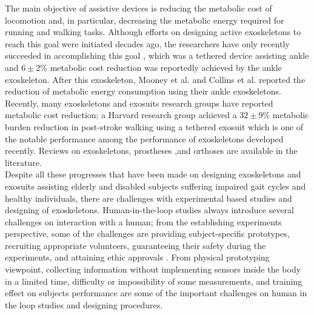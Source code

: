 \documentclass[10pt,letterpaper]{article}
\begin{document}
The main objective of assistive devices is reducing the metabolic cost of locomotion and, in particular, decreasing the metabolic energy required for running and walking tasks. Although efforts on designing active exoskeletons to reach this goal were initiated decades ago, the researchers have only recently succeeded in accomplishing this goal \cite{40}, which was a tethered device assisting ankle and  $6 \pm 2$\% metabolic cost reduction was reportedly achieved by the ankle exoskeleton. After this exoskeleton, Mooney et al. \cite{41} and Collins et al. \cite{42} reported the reduction of metabolic energy consumption using their ankle exoskeletons. Recently, many exoskeletons and exosuits research groups have reported metabolic cost reduction; a Harvard research group \cite{43} achieved a $32 \pm 9$\% metabolic burden reduction in post-stroke walking using a tethered exosuit which is one of the notable performance among the performance of exoskeletons developed recently. Reviews on exoskeletons, prostheses ,and orthoses are available in the literature\cite{31,36,37,38,39}.\\
Despite all these progresses that have been made on designing exoskeletons and exosuits assisting elderly and disabled subjects suffering impaired gait cycles and healthy individuals, there are challenges with experimental based studies and designing of exoskeletons. Human-in-the-loop studies always introduce several challenges on interaction with a human; from the establishing experiments perspective, some of the challenges are providing subject-specific prototypes, recruiting appropriate volunteers, guaranteeing their safety during the experiments, and attaining ethic approvals \cite{2}. From physical prototyping viewpoint, collecting information without implementing sensors inside the body in a limited time\cite{2}, difficulty or impossibility of some measurements\cite{89}, and training effect on subjects performance \cite{90,91} are some of the important challenges on human in the loop studies and designing procedures.\\
\end{document}
